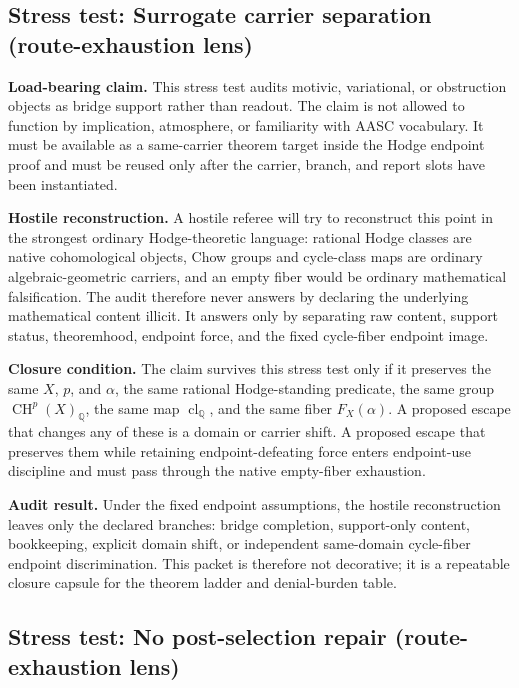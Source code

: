 \documentclass[11pt]{article}
\newcommand{\QQ}{\mathbb{Q}}
\newcommand{\CH}{\operatorname{CH}}
\newcommand{\clQ}{\operatorname{cl}_{\QQ}}
\begin{document}
\subsection{Stress test: Surrogate carrier separation (route-exhaustion lens)}

\par\noindent\textbf{Load-bearing claim.} This stress test audits motivic, variational, or obstruction objects as bridge support rather than readout. The claim is not allowed to function by implication, atmosphere, or familiarity with AASC vocabulary. It must be available as a same-carrier theorem target inside the Hodge endpoint proof and must be reused only after the carrier, branch, and report slots have been instantiated.

\par\noindent\textbf{Hostile reconstruction.} A hostile referee will try to reconstruct this point in the strongest ordinary Hodge-theoretic language: rational Hodge classes are native cohomological objects, Chow groups and cycle-class maps are ordinary algebraic-geometric carriers, and an empty fiber would be ordinary mathematical falsification. The audit therefore never answers by declaring the underlying mathematical content illicit. It answers only by separating raw content, support status, theoremhood, endpoint force, and the fixed cycle-fiber endpoint image.

\par\noindent\textbf{Closure condition.} The claim survives this stress test only if it preserves the same $X$, $p$, and $\alpha$, the same rational Hodge-standing predicate, the same group $\CH^p(X)_\QQ$, the same map $\clQ$, and the same fiber $F_X(\alpha)$. A proposed escape that changes any of these is a domain or carrier shift. A proposed escape that preserves them while retaining endpoint-defeating force enters endpoint-use discipline and must pass through the native empty-fiber exhaustion.

\par\noindent\textbf{Audit result.} Under the fixed endpoint assumptions, the hostile reconstruction leaves only the declared branches: bridge completion, support-only content, bookkeeping, explicit domain shift, or independent same-domain cycle-fiber endpoint discrimination. This packet is therefore not decorative; it is a repeatable closure capsule for the theorem ladder and denial-burden table.


\subsection{Stress test: No post-selection repair (route-exhaustion lens)}
\end{document}
